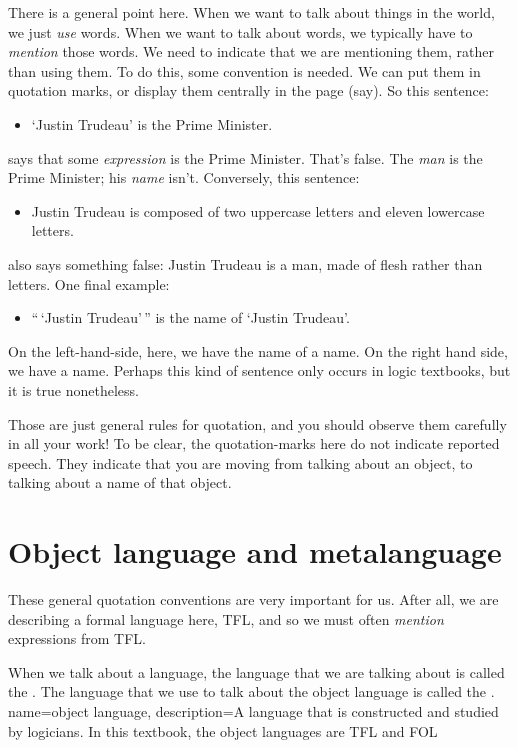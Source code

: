 There is a general point here. When we want to talk about things in the world, we just \emph{use} words. When we want to talk about words, we typically have to \emph{mention} those words. We need to indicate that we are mentioning them, rather than using them. To do this, some convention is needed. We can put them in quotation marks, or display them centrally in the page (say). So this sentence:
	\begin{itemize}
		\item `Justin Trudeau' is the Prime Minister.
	\end{itemize}
says that some \emph{expression} is the Prime Minister. That's false. The \emph{man} is the Prime Minister; his \emph{name} isn't. Conversely, this sentence:
	\begin{itemize}
		\item Justin Trudeau is composed of two uppercase letters and eleven lowercase letters.
	\end{itemize}
also says something false: Justin Trudeau is a man, made of flesh rather than letters. One final example:
	\begin{itemize}
		\item ``\,`Justin Trudeau'\,'' is the name of `Justin Trudeau'.
	\end{itemize}
On the left-hand-side, here, we have the name of a name. On the right hand side, we have a name. Perhaps this kind of sentence only occurs in logic textbooks, but it is true nonetheless.

Those are just general rules for quotation, and you should observe them carefully in all your work! To be clear, the quotation-marks here do not indicate reported speech. They indicate that you are moving from talking about an object, to talking about a name of that object.



\section{Object language and metalanguage}
These general quotation conventions are very important for us. After all, we are describing a formal language here, TFL, and so we must often \emph{mention} expressions from TFL.

When we talk about a language, the language that we are talking about is called the . The language that we use to talk about the object language is called the .
\label{def.metalanguage}
{
name=object language,
description={A language that is constructed and studied by logicians. In this textbook,
 the object languages are TFL and FOL}
}

